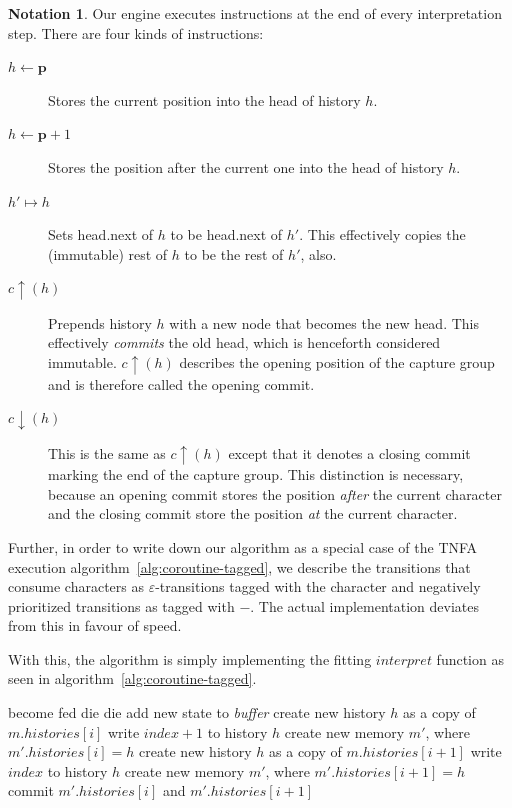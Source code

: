 \documentclass[11pt,a4paper,twoside,openright]{Thesis}
\theoremstyle{definition}
\newtheorem*{notation}{Notation}
\newcommand{\pos}{\mathbf{\mathbf{p}}}
\begin{document}
\begin{notation}
Our engine executes instructions at the end of every interpretation
step. There are four kinds of instructions:

\begin{description}
\item [$h\leftarrow\pos$] Stores the current position into the head of history $h$.
\item [$h\leftarrow\pos+1$] Stores the position after the current one into the
  head of history $h$.
\item [$h'\mapsto h$] Sets head.next of $h$ to be head.next of $h'$.
	This effectively copies the (immutable) rest of $h$ to be the rest of $h'$, also.
\item [$c\uparrow(h)$] Prepends history $h$ with a new node that becomes the
  new head.  This effectively \emph{commits} the old head, which is henceforth
  considered immutable. $c\uparrow(h)$ describes the opening position of the
  capture group and is therefore called the opening commit.
\item [$c\downarrow(h)$] This is the same as $c\uparrow(h)$ except that it
  denotes a closing commit marking the end of the capture group.  This
  distinction is necessary, because an opening commit stores the position
  \emph{after} the current character and the closing commit store the
  position \emph{at} the current character.
\end{description}
\end{notation}

Further, in order to write down our algorithm as a special case of the TNFA
execution algorithm~\ref{alg:coroutine-tagged}, we describe the transitions
that consume characters as $\varepsilon$-transitions tagged with the
character and negatively prioritized transitions as tagged with $-$. The
actual implementation deviates from this in favour of speed.

With this, the algorithm is simply implementing the fitting $interpret$
function as seen in algorithm~\ref{alg:coroutine-tagged}.

\begin{algorithm*}[htbp]
\begin{algorithmic}[1]
      \State become fed
      \Else
        \State die
      \EndIf
    \EndIf
        \State die
      \EndIf
      \State add new state to \emph{buffer}
    \EndIf
      \State create new history $h$ as a copy of $m.histories[i]$
      \State write $index+1$ to history $h$
      \State create new memory $m'$, where $m'.histories[i] = h$
    \EndIf
      \State create new history $h$ as a copy of $m.histories[i+1]$
      \State write $index$ to history $h$
      \State create new memory $m'$, where $m'.histories[i+1] = h$
      \State commit $m'.histories[i]$ and $m'.histories[i+1]$
    \EndIf
  \EndFunction
\end{algorithmic}
\label{alg:interpret}
\end{algorithm*}
\end{document}
